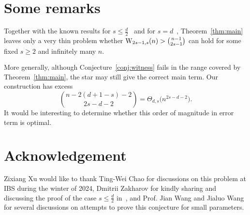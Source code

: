\section{Some remarks}
Together with the known results for \(s\le \frac{d}{2}\)~\cite{2026Chao} and for
\(s=d\)~\cite{2025CombProof}, Theorem~\ref{thm:main} leaves only a very thin
problem whether
\(
\operatorname{W}_{2s-1,s}(n)>\binom{n-1}{2s-1}
\)
can hold for some fixed \(s\ge2\) and infinitely many \(n\).

More generally, although Conjecture~\ref{conj:witness} fails in the range
covered by Theorem~\ref{thm:main}, the star may still give the correct main
term. Our construction has excess
\[
\binom{n-2(d+1-s)-2}{2s-d-2}
=\Theta_{d,s}\bigl(n^{2s-d-2}\bigr).
\]
It would be interesting to determine whether this order of magnitude in error term is
optimal.

\section*{Acknowledgement}
Zixiang Xu would like to thank Ting-Wei Chao for discussions on this problem at IBS during the winter of 2024, Dmitrii Zakharov for kindly sharing and discussing the proof of the case \(s\le \frac{d}{2}\) in~\cite{2026Chao}, and Prof. Jian Wang and Jialuo Wang for several discussions on attempts to prove this conjecture for small parameters.
